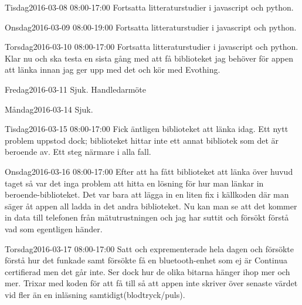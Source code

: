 \documentclass[a4paper,oneside]{book}
\begin{document}
\begin{diary}{Tisdag}{2016-03-08 08:00-17:00}
	Fortsatta litteraturstudier i javascript och python.
\end{diary}

\begin{diary}{Onsdag}{2016-03-09 08:00-19:00}
	Fortsatta litteraturstudier i javascript och python.
\end{diary}

\begin{diary}{Torsdag}{2016-03-10 08:00-17:00}
	Fortsatta litteraturstudier i javascript och python. Klar nu och ska testa en sista gång med att få biblioteket jag behöver för appen att länka innan jag ger upp med det och kör med Evothing.
\end{diary}

\begin{diary}{Fredag}{2016-03-11}
	Sjuk. Handledarmöte
\end{diary}
\newpage

\begin{diary}{Måndag}{2016-03-14}
	Sjuk.
\end{diary}

\begin{diary}{Tisdag}{2016-03-15 08:00-17:00}
	Fick äntligen biblioteket att länka idag. Ett nytt problem uppstod dock; biblioteket hittar inte ett annat bibliotek som det är beroende av. Ett steg närmare i alla fall.
\end{diary}

\begin{diary}{Onsdag}{2016-03-16 08:00-17:00}
	Efter att ha fått biblioteket att länka över huvud taget så var det inga problem att hitta en lösning för hur man länkar in beroende-biblioteket. Det var bara att lägga in en liten fix i källkoden där man säger åt appen all ladda in det andra biblioteket. Nu kan man se att det kommer in data till telefonen från mätutrustningen och jag har suttit och försökt förstå vad som egentligen händer.
\end{diary}

\begin{diary}{Torsdag}{2016-03-17 08:00-17:00}
	Satt och exprementerade hela dagen och försökte förstå hur det funkade samt försökte få en bluetooth-enhet som ej är Continua certifierad men det går inte. Ser dock hur de olika bitarna hänger ihop mer och mer. Trixar med koden för att få till så att appen inte skriver över senaste värdet vid fler än en inläsning samtidigt(blodtryck/puls).
\end{diary}
\end{document}
